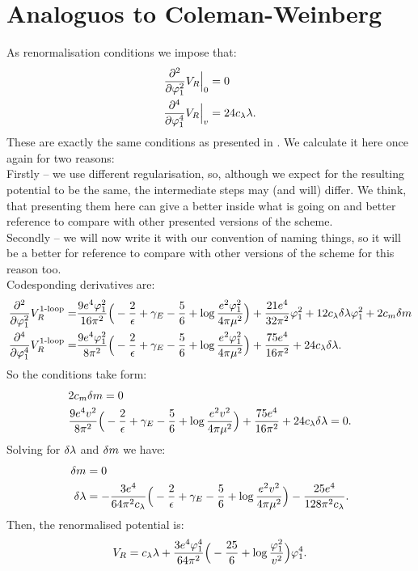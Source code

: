 \section{Analoguos to Coleman-Weinberg}
As renormalisation conditions we impose that:
\begin{align}
\frac{\partial^2 }{\partial \varphi_1^2}V_R\Big|_{0} &= 0 \\
\frac{\partial^4 }{\partial \varphi_1^4}V_R\Big|_{v} &= 24c_\lambda\lambda.
\end{align}
These are exactly the same conditions as presented in \citeColWein. We calculate it here once 
again for two reasons: \\ 
Firstly -- we use different regularisation, so, although we expect 
for the resulting potential to be the same, the intermediate steps may (and will) differ. 
We think, that 
presenting them here can give a better inside what is going on and better reference to compare 
with other presented versions of the scheme. \\
Secondly -- we will now write it with our convention of naming things, so it will be a better 
for reference
to compare with other versions of the scheme for this reason too. \\
Codesponding derivatives are:
\begin{align}
\frac{\partial^2 }{\partial \varphi_1^2}V_R^{\textrm{1-loop}} = &\frac{9e^4\varphi_1^2}{16\pi^2}\Big(-\frac{2}{\epsilon}+\gamma_E-
\frac{5}{6}+\log{\frac{e^2\varphi_1^2}{4\pi\mu^2}}\Big)+\frac{21e^4}{32\pi^2}\varphi_1^2+ 
12c_\lambda\delta\lambda\varphi_1^2+2c_m\delta m \\
\frac{\partial^4 }{\partial \varphi_1^4}V_R^{\textrm{1-loop}} = &\frac{9e^4\varphi_1^2}{8\pi^2}\Big(-\frac{2}{\epsilon}+\gamma_E-
\frac{5}{6}+\log{\frac{e^2\varphi_1^2}{4\pi\mu^2}}\Big)+\frac{75e^4}{16\pi^2}+24c_\lambda\delta\lambda.
\end{align}
So the conditions take form:
\begin{align}
&2c_m\delta m = 0\\
&\frac{9e^4v^2}{8\pi^2}\Big(-\frac{2}{\epsilon}+\gamma_E-
\frac{5}{6}+\log{\frac{e^2v^2}{4\pi\mu^2}}\Big)+\frac{75e^4}{16\pi^2}+24c_\lambda\delta\lambda = 0.
\end{align}
Solving for $\delta\lambda$ and $\delta m$ we have:
\begin{align}
\delta m &= 0 \\
\delta\lambda &= -\frac{3e^4}{64\pi^2c_\lambda}\Big(-\frac{2}{\epsilon}+\gamma_E-
\frac{5}{6}+\log\frac{e^2v^2}{4\pi\mu^2}\Big)-\frac{25e^4}{128\pi^2c_\lambda} .
\end{align}
Then, the renormalised potential is:
\begin{align}
V_R = c_\lambda\lambda + \frac{3e^4\varphi_1^4}{64\pi^2}\Big(- 
\frac{25}{6}+\log\frac{\varphi_1^2}{v^2}\Big)\varphi_1^4.
\end{align}
